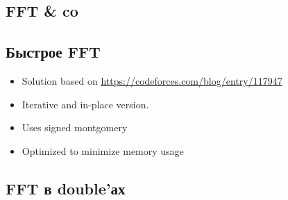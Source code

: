 \subsection{FFT \& co}

\subsection{Быстрое FFT}
\begin{itemize}
    \item Solution based on \underline{\url{https://codeforces.com/blog/entry/117947}}
    \item Iterative and in-place version.
    \item Uses signed montgomery
    \item Optimized to minimize memory usage
\end{itemize}

\subsection{FFT в double'ах}

